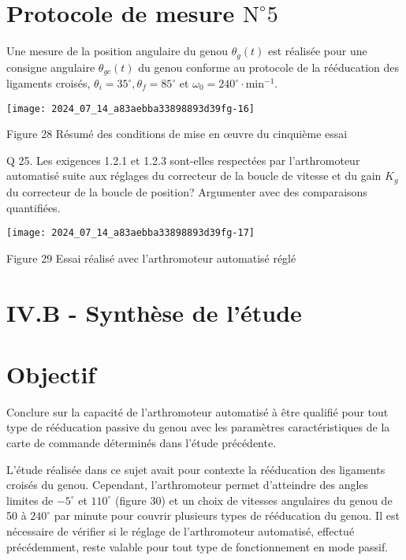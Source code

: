 \section*{Protocole de mesure $\mathrm{N}^{\circ} 5$}
Une mesure de la position angulaire du genou $\theta_{g}(t)$ est réalisée pour une consigne angulaire $\theta_{g c}(t)$ du genou conforme au protocole de la rééducation des ligaments croisés, $\theta_{i}=35^{\circ}, \theta_{f}=85^{\circ}$ et $\omega_{0}=240^{\circ} \cdot \mathrm{min}^{-1}$.

\begin{center}
\texttt{[image: 2024\_07\_14\_a83aebba33898893d39fg-16]}
\end{center}

Figure 28 Résumé des conditions de mise en œuvre du cinquième essai

Q 25. Les exigences 1.2.1 et 1.2.3 sont-elles respectées par l'arthromoteur automatisé suite aux réglages du correcteur de la boucle de vitesse et du gain $K_{g}$ du correcteur de la boucle de position? Argumenter avec des comparaisons quantifiées.

\begin{center}
\texttt{[image: 2024\_07\_14\_a83aebba33898893d39fg-17]}
\end{center}

Figure 29 Essai réalisé avec l'arthromoteur automatisé réglé

\section*{IV.B - Synthèse de l'étude}
\section*{Objectif}
Conclure sur la capacité de l'arthromoteur automatisé à être qualifié pour tout type de rééducation passive du genou avec les paramètres caractéristiques de la carte de commande déterminés dans l'étude précédente.

L'étude réalisée dans ce sujet avait pour contexte la rééducation des ligaments croisés du genou. Cependant, l'arthromoteur permet d'atteindre des angles limites de $-5^{\circ}$ et $110^{\circ}$ (figure 30) et un choix de vitesses angulaires du genou de 50 à $240^{\circ}$ par minute pour couvrir plusieurs types de rééducation du genou. Il est nécessaire de vérifier si le réglage de l'arthromoteur automatisé, effectué précédemment, reste valable pour tout type de fonctionnement en mode passif.

